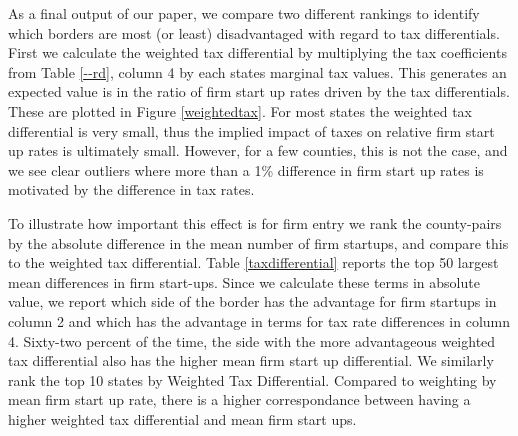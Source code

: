 As a final output of our paper, we compare two different rankings to identify which borders are most (or least) disadvantaged with regard to tax differentials. First we calculate the weighted tax differential by multiplying the tax coefficients from Table \ref{--rd}, column 4 by each states marginal tax values. This generates an expected value is in the ratio of firm start up rates driven by the tax differentials.  These are plotted in Figure \ref{weightedtax}. For most states the weighted tax differential is very small, thus the implied impact of taxes on relative firm start up rates is ultimately small. However, for a few counties, this is not the case, and we see clear outliers where more than a 1\% difference in firm start up rates is motivated by the difference in tax rates. 

To illustrate how important this effect is for firm entry we rank the county-pairs by the absolute difference in the mean number of firm startups, and compare this to the weighted tax differential. Table \ref{taxdifferential} reports the top 50 largest mean differences in firm start-ups.  Since we calculate these terms in absolute value, we report which side of the border has  the advantage for firm startups in column 2 and which has the advantage in terms for tax rate differences in column 4.  Sixty-two percent of the time, the side with the more advantageous weighted tax differential also has the higher mean firm start up differential. We similarly rank the top 10 states by Weighted Tax Differential. Compared to weighting by mean firm start up rate, there is a higher correspondance between having a higher weighted tax differential and mean firm start ups.